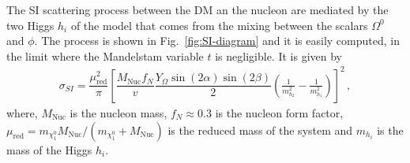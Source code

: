 \documentclass[12pt,letterpaper]{article}
\begin{document}
%
The SI scattering process between the DM an the nucleon are mediated by the two Higgs $h_i$ of the model that comes from the mixing between the scalars $\Omega^0$ and $\phi$. The process is shown in Fig.~\ref{fig:SI-diagram} and it is easily computed, in the limit where the  Mandelstam variable $t$ is negligible. It is given by
%
\begin{align}
\label{eq:sigma-SI}
\sigma_{SI}=\dfrac{\mu_{\text{red}}^2}{\pi}\left[\dfrac{M_{\text{Nuc}}f_N}{v}\dfrac{Y_{\Omega}\sin(2\alpha)\sin(2\beta)}{2}\left(\frac{1}{m_{h_2}^2}-\frac{1}{m_{h_1}^2}\right)\right]^2\,,
\end{align}
%
where, $M_{\text{Nuc}}$ is the nucleon mass, $f_N\approx 0.3$ is the nucleon form factor, $\mu_{\text{red}}= m_{\chi^0_1}M_{\text{Nuc}}/(m_{\chi^0_1}+M_{\text{Nuc}})$ is the reduced mass of the system and  $m_{h_i}$ is the mass of the Higgs $h_i$.
\end{document}
